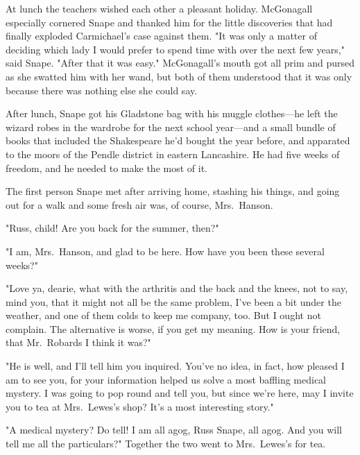 At lunch the teachers wished each other a pleasant holiday. McGonagall especially cornered Snape and thanked him for the little discoveries that had finally exploded Carmichael's case against them. "It was only a matter of deciding which lady I would prefer to spend time with over the next few years," said Snape. "After that it was easy." McGonagall's mouth got all prim and pursed as she swatted him with her wand, but both of them understood that it was only because there was nothing else she could say.

After lunch, Snape got his Gladstone bag with his muggle clothes—he left the wizard robes in the wardrobe for the next school year—and a small bundle of books that included the Shakespeare he'd bought the year before, and apparated to the moors of the Pendle district in eastern Lancashire. He had five weeks of freedom, and he needed to make the most of it.

The first person Snape met after arriving home, stashing his things, and going out for a walk and some fresh air was, of course, Mrs.~Hanson.

"Russ, child! Are you back for the summer, then?"

"I am, Mrs.~Hanson, and glad to be here. How have you been these several weeks?"

"Love ya, dearie, what with the arthritis and the back and the knees, not to say, mind you, that it might not all be the same problem, I've been a bit under the weather, and one of them colds to keep me company, too. But I ought not complain. The alternative is worse, if you get my meaning. How is your friend, that Mr.~Robards I think it was?"

"He is well, and I'll tell him you inquired. You've no idea, in fact, how pleased I am to see you, for your information helped us solve a most baffling medical mystery. I was going to pop round and tell you, but since we're here, may I invite you to tea at Mrs.~Lewes's shop? It's a most interesting story."

"A medical mystery? Do tell! I am all agog, Russ Snape, all agog. And you will tell me all the particulars?" Together the two went to Mrs.~Lewes's for tea.


